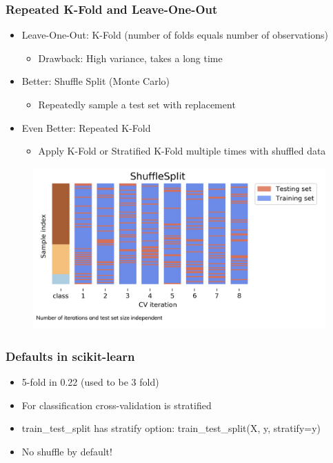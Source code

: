 \documentclass[compress, aspectratio=54]{beamer}
\begin{document}
\begin{frame}
\frametitle{Repeated K-Fold and Leave-One-Out}
\begin{itemize}

\item Leave-One-Out: K-Fold (number of folds equals number of observations)
	\begin{itemize}
	\item Drawback: High variance, takes a long time
	\end{itemize}

\item Better: Shuffle Split (Monte Carlo)
	\begin{itemize}
	\item Repeatedly sample a test set with replacement
	\end{itemize}

\item Even Better: Repeated K-Fold
	\begin{itemize}
	\item Apply K-Fold or Stratified K-Fold multiple times with shuffled data
	\end{itemize}

\end{itemize}
\end{frame}



\begin{frame}
\begin{figure}
\includegraphics[width=\linewidth ]{Figures/shuffle-split.png}
\end{figure}
\end{frame}



\begin{frame}
\frametitle{Defaults in scikit-learn}
\begin{itemize}
\item 5-fold in 0.22 (used to be 3 fold)
\item For classification cross-validation is stratified
\item train\_test\_split has stratify option: train\_test\_split(X, y, stratify=y)
\item No shuffle by default!
\end{itemize}
\end{frame}
\end{document}
